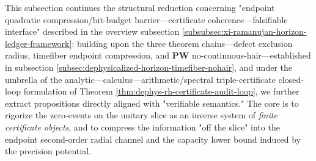 \label{subsec:xi-certificate-coherence-orthogonal-axis-capacity-part1}

This subsection continues the structural reduction concerning "endpoint quadratic compression/bit-budget barrier—certificate coherence—falsifiable interface" described in the overview subsection \ref{subsubsec:xi-ramanujan-horizon-ledger-framework}: building upon the three theorem chains—defect exclusion radius, timefiber endpoint compression, and \(\mathbf{PW}\) no-continuous-hair—established in subsection \ref{subsec:dephysicalized-horizon-timefiber-nohair}, and under the umbrella of the analytic—calculus—arithmetic/spectral triple-certificate closed-loop formulation of Theorem \ref{thm:dephys-rh-certificate-audit-loop}, we further extract propositions directly aligned with "verifiable semantics." The core is to rigorize the zero-events on the unitary slice as an inverse system of \emph{finite certificate objects}, and to compress the information "off the slice" into the endpoint second-order radial channel and the capacity lower bound induced by the precision potential.

